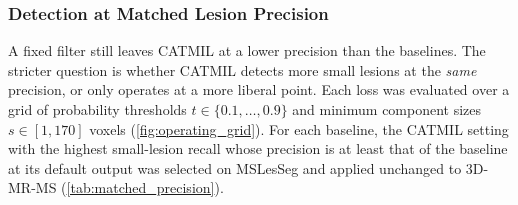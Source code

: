 \subsubsection{Detection at Matched Lesion Precision}
\label{sec:matched_precision}

A fixed filter still leaves CATMIL at a lower precision than the
baselines. The stricter question is whether CATMIL detects more small
lesions at the \emph{same} precision, or only operates at a more liberal
point. Each loss was evaluated over a grid of probability thresholds
$t \in \{0.1,\dots,0.9\}$ and minimum component sizes $s \in [1, 170]$
voxels (\cref{fig:operating_grid}). For each baseline, the CATMIL setting
with the highest small-lesion recall whose precision is at least that of
the baseline at its default output was selected on MSLesSeg and applied
unchanged to 3D-MR-MS (\cref{tab:matched_precision}).

